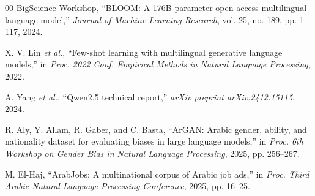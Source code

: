 \documentclass[conference]{IEEEtran}
\begin{document}
\begin{thebibliography}{00}
BigScience Workshop, ``BLOOM: A 176B-parameter open-access multilingual language model,'' \textit{Journal of Machine Learning Research}, vol. 25, no. 189, pp. 1--117, 2024.

X. V. Lin \textit{et al.}, ``Few-shot learning with multilingual generative language models,'' in \textit{Proc. 2022 Conf. Empirical Methods in Natural Language Processing}, 2022.

A. Yang \textit{et al.}, ``Qwen2.5 technical report,'' \textit{arXiv preprint arXiv:2412.15115}, 2024.

R. Aly, Y. Allam, R. Gaber, and C. Basta, ``ArGAN: Arabic gender, ability, and nationality dataset for evaluating biases in large language models,'' in \textit{Proc. 6th Workshop on Gender Bias in Natural Language Processing}, 2025, pp. 256--267.

M. El-Haj, ``ArabJobs: A multinational corpus of Arabic job ads,'' in \textit{Proc. Third Arabic Natural Language Processing Conference}, 2025, pp. 16--25.

\end{thebibliography}
\end{document}
